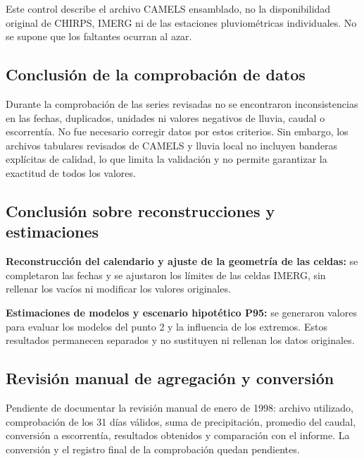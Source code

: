 Este control describe el archivo CAMELS ensamblado, no la disponibilidad original
de CHIRPS, IMERG ni de las estaciones pluviométricas individuales. No se supone
que los faltantes ocurran al azar.

\subsection{Conclusión de la comprobación de datos}
Durante la comprobación de las series revisadas no se encontraron inconsistencias en las fechas, duplicados, unidades ni valores negativos de lluvia, caudal o escorrentía. No fue necesario corregir datos por estos criterios. Sin embargo, los archivos tabulares revisados de CAMELS y lluvia local no incluyen banderas explícitas de calidad, lo que limita la validación y no permite garantizar la exactitud de todos los valores.



\subsection{Conclusión sobre reconstrucciones y estimaciones}
\textbf{Reconstrucción del calendario y ajuste de la geometría de las celdas:} se completaron las fechas y se ajustaron los límites de las celdas IMERG, sin rellenar los vacíos ni modificar los valores originales.

\textbf{Estimaciones de modelos y escenario hipotético P95:} se generaron valores para evaluar los modelos del punto 2 y la influencia de los extremos. Estos resultados permanecen separados y no sustituyen ni rellenan los datos originales.

\subsection{Revisión manual de agregación y conversión}
Pendiente de documentar la revisión manual de enero de 1998: archivo utilizado, comprobación de los 31 días válidos, suma de precipitación, promedio del caudal, conversión a escorrentía, resultados obtenidos y comparación con el informe. La conversión y el registro final de la comprobación quedan pendientes.
